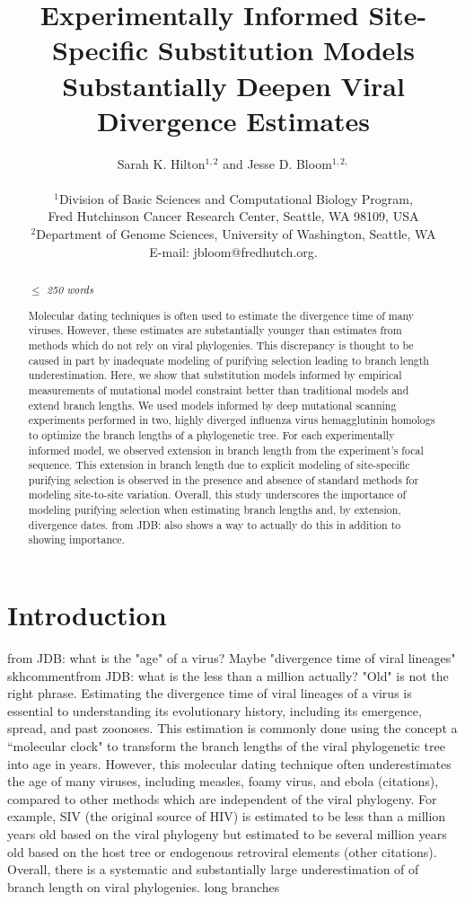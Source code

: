 \documentclass[11pt]{article}
\title{Experimentally Informed Site-Specific Substitution Models Substantially Deepen Viral Divergence Estimates}
\author
{Sarah K. Hilton$^{1,2}$  and Jesse D. Bloom$^{1,2,}$\\
\\
\normalsize{$^1$Division of Basic Sciences and Computational Biology Program,}\\
\normalsize{Fred Hutchinson Cancer Research Center, Seattle, WA 98109, USA}\\
\normalsize{$^2$Department of Genome Sciences, University of Washington, Seattle, WA}\\
\normalsize{E-mail:  jbloom@fredhutch.org.}\\
}
\date{}
\newcommand\skhcomment[1]{{\color{magenta}#1}}
\begin{document}
 


\maketitle 


\begin{abstract}
\textit{$\leq$ 250 words}   

Molecular dating techniques is often used to estimate the divergence time of many viruses. 
However, these estimates are substantially younger than estimates from methods which do not rely on viral phylogenies. 
This discrepancy is thought to be caused in part by inadequate modeling of purifying selection leading to branch length underestimation. 
Here, we show that substitution models informed by empirical measurements of mutational model constraint better than traditional models and extend branch lengths. 
We used models informed by deep mutational scanning experiments performed in two, highly diverged influenza virus hemagglutinin homologs to optimize the branch lengths of a phylogenetic tree. 
For each experimentally informed model, we observed extension in branch length from the experiment's focal sequence. 
This extension in branch length due to explicit modeling of site-specific purifying selection is observed in the presence and absence of standard methods for modeling site-to-site variation. 
Overall, this study underscores the importance of modeling purifying selection when estimating branch lengths and, by extension, divergence dates. 
\skhcomment{from JDB: also shows a way to actually do this in addition to showing importance.}

\end{abstract}

\clearpage

\section*{Introduction} 
\skhcomment{from JDB: what is the "age" of a virus? Maybe "divergence time of viral lineages"}
skhcomment{from JDB: what is the less than a million actually? "Old" is not the right phrase.}
Estimating the divergence time of viral lineages of a virus is essential to understanding its evolutionary history, including its emergence, spread, and past zoonoses. 
This estimation is commonly done using the concept a ``molecular clock" to transform the branch lengths of the viral phylogenetic tree into age in years. 
However, this molecular dating technique often underestimates the age of many viruses, including measles, foamy virus, and ebola \skhcomment{(citations)}, compared to other methods which are independent of the viral phylogeny. 
For example, SIV (the original source of HIV) is estimated to be less than a million years old based on the viral phylogeny \citep{sharp2000origins,wertheim2009dating,worobey2010island} but estimated to be several million years old based on the host tree or endogenous retroviral elements  \citep{compton2013host} \skhcomment{(other citations)}. 
Overall, there is a systematic and substantially large underestimation of of branch length on viral phylogenies. 
\skhcomment{long branches}
\end{document}
